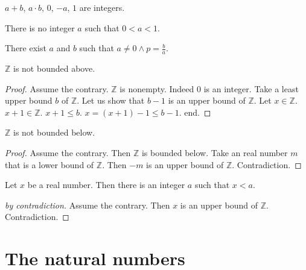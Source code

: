 \documentclass[english]{article}
\begin{document}
\begin{forthel}

\begin{axiom}
$a + b$, $a \cdot b$, $0$, $-a$, $1$ are integers.
\end{axiom}

\begin{axiom}
There is no integer $a$ such that $0 < a < 1$.
\end{axiom}

\begin{axiom}
There exist $a$ and $b$ such that
$a \neq 0 \wedge p = \frac{b}{a}$.
\end{axiom}

\begin{theorem}[Archimedes 1]\label{Archimedes_1}
$\mathbb{Z}$ is not bounded above.
\end{theorem}
\begin{proof}
Assume the contrary.
$\mathbb{Z}$ is nonempty. Indeed $0$ is an integer.
Take a least upper bound
$b$ of $\mathbb{Z}$.
Let us show that $b - 1$ is an upper bound of $\mathbb{Z}$.
Let $x \in \mathbb{Z}$. $x + 1 \in \mathbb{Z}$.
$x + 1 \leq b$.
$x = (x + 1) - 1 \leq b - 1$.
end.
\end{proof}

\begin{theorem}
$\mathbb{Z}$ is not bounded below.
\end{theorem}
\begin{proof}
Assume the contrary.
Then $\mathbb{Z}$ is bounded below.
Take an real number $m$ that is a lower bound of $\mathbb{Z}$.
Then $-m$ is an upper bound of $\mathbb{Z}$.
Contradiction.
\end{proof}

\begin{theorem}[Archimedes 2]\label{Archimedes_2}
Let $x$ be a real number.
Then there is an integer $a$
such that $x < a$.
\end{theorem}
\begin{proof}[by contradiction]
Assume the contrary.
Then $x$ is an upper bound of $\mathbb{Z}$.
Contradiction.
\end{proof}

\end{forthel}


\section{The natural numbers}
\end{document}
